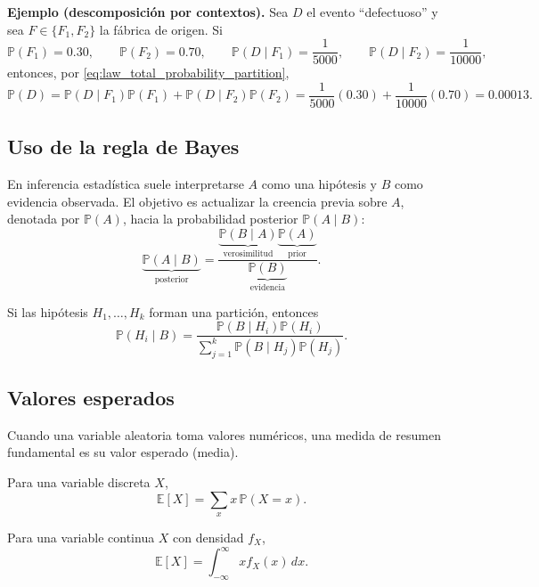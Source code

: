 \documentclass[12pt]{report} %
\begin{document}
\textbf{Ejemplo (descomposición por contextos).} Sea $D$ el evento ``defectuoso'' y sea $F\in\{F_1,F_2\}$ la fábrica de origen. Si
$$
    \mathbb{P}(F_1)=0.30,
    \qquad
    \mathbb{P}(F_2)=0.70,
    \qquad
    \mathbb{P}(D\mid F_1)=\frac{1}{5000},
    \qquad
    \mathbb{P}(D\mid F_2)=\frac{1}{10000},
$$
entonces, por \eqref{eq:law_total_probability_partition},
$$
    \mathbb{P}(D)=\mathbb{P}(D\mid F_1)\mathbb{P}(F_1)+\mathbb{P}(D\mid F_2)\mathbb{P}(F_2)
    =\frac{1}{5000}(0.30)+\frac{1}{10000}(0.70)=0.00013.
$$

\subsection{Uso de la regla de Bayes}

En inferencia estadística suele interpretarse $A$ como una hipótesis y $B$ como evidencia observada. El objetivo es actualizar la creencia previa sobre $A$, denotada por $\mathbb{P}(A)$, hacia la probabilidad posterior $\mathbb{P}(A\mid B)$:
\begin{equation}
    \underbrace{\mathbb{P}(A\mid B)}_{\text{posterior}}
    =
    \frac{\underbrace{\mathbb{P}(B\mid A)}_{\text{verosimilitud}}\underbrace{\mathbb{P}(A)}_{\text{prior}}}{\underbrace{\mathbb{P}(B)}_{\text{evidencia}}}.
    \label{eq:bayesian_update_decomposition}
\end{equation}

Si las hipótesis $H_1,\dots,H_k$ forman una partición, entonces
\begin{equation}
    \mathbb{P}(H_i\mid B)=\frac{\mathbb{P}(B\mid H_i)\mathbb{P}(H_i)}{\sum_{j=1}^{k}\mathbb{P}(B\mid H_j)\mathbb{P}(H_j)}.
    \label{eq:bayes_partition_hypotheses}
\end{equation}

\subsection{Valores esperados}

Cuando una variable aleatoria toma valores numéricos, una medida de resumen fundamental es su valor esperado (media).

Para una variable discreta $X$,
\begin{equation}
    \mathbb{E}[X]=\sum_{x} x\,\mathbb{P}(X=x).
    \label{eq:expected_value_discrete}
\end{equation}

Para una variable continua $X$ con densidad $f_X$,
\begin{equation}
    \mathbb{E}[X]=\int_{-\infty}^{\infty} x f_X(x)\,dx.
    \label{eq:expected_value_continuous}
\end{equation}
\end{document}
